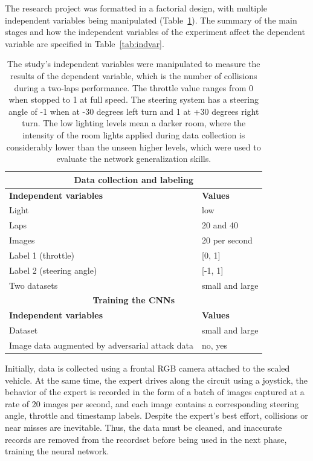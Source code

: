 \documentclass[12pt]{article}
\begin{document}
The research project was formatted in a factorial design, with multiple independent variables being manipulated (Table~\ref{tab:datacol}). The summary of the main stages and how the independent variables of the experiment affect the dependent variable are specified in Table~\ref{tab:indvar}.

\begin{table}[H]
\begin{center}
\begin{tabular}{  |p{8cm}|p{4cm}| } 
\hline
 \multicolumn{2}{|c|}{\textbf{Data collection and labeling}} \\
\hline
\textbf{Independent variables} & \textbf{Values} \\
\hline
Light & low  \\ 
Laps & 20 and 40 \\ 
Images & 20 per second \\ 
Label 1 (throttle) & [0, 1]\\ 
Label 2 (steering angle) & [-1, 1] \\ 
Two datasets & small and large\\ 
\hline
 \multicolumn{2}{|c|}{\textbf{Training the CNNs}} \\
\hline
\textbf{Independent variables} & \textbf{Values} \\
\hline
Dataset & small and large \\ 
Image data augmented by adversarial attack data & no, yes \\ 

\hline
\end{tabular}
\caption{\label{tab:datacol}The study's independent variables were manipulated to measure the results of the dependent variable, which is the number of collisions during a two-laps performance. The throttle value ranges from 0 when stopped to 1 at full speed. The steering system has a steering angle of -1 when at -30 degrees left turn and 1 at +30 degrees right turn. The low lighting levels mean a darker room, where the intensity of the room lights applied during data collection is considerably lower than the unseen higher levels, which were used to evaluate the network generalization skills. 
}
\end{center}
\end{table}

Initially, data is collected using a frontal RGB camera attached to the scaled vehicle. At the same time, the expert drives along the circuit using a joystick, the behavior of the expert is recorded in the form of a batch of images captured at a rate of 20 images per second, and each image contains a corresponding steering angle, throttle and timestamp labels. Despite the expert's best effort, collisions or near misses are inevitable. Thus, the data must be cleaned, and inaccurate records are removed from the recordset before being used in the next phase, training the neural network. 
\end{document}
